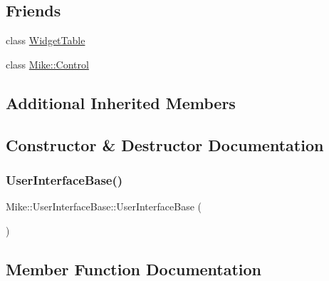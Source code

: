 \subsection*{Friends}
\begin{DoxyCompactItemize}
\item 
class \hyperlink{class_mike_1_1_user_interface_base_abcbb78a2aa9a92d43c9ea7c42cbc681e}{Widget\+Table}
\item 
class \hyperlink{class_mike_1_1_user_interface_base_aa43d07603cc032a3ea563afd34b7581c}{Mike\+::\+Control}
\end{DoxyCompactItemize}
\subsection*{Additional Inherited Members}


\subsection{Constructor \& Destructor Documentation}
\mbox{\label{class_mike_1_1_user_interface_base_ada6313efe882ae0535f64cf2f3aa1aa2}} 
\subsubsection{\texorpdfstring{User\+Interface\+Base()}{UserInterfaceBase()}}
{\footnotesize\ttfamily Mike\+::\+User\+Interface\+Base\+::\+User\+Interface\+Base (\begin{DoxyParamCaption}{ }\end{DoxyParamCaption})\hspace{0.3cm}{\ttfamily [protected]}}



\subsection{Member Function Documentation}
\mbox{\label{class_mike_1_1_user_interface_base_acb35df6eb1e854e714c42f6ae473a193}} 
